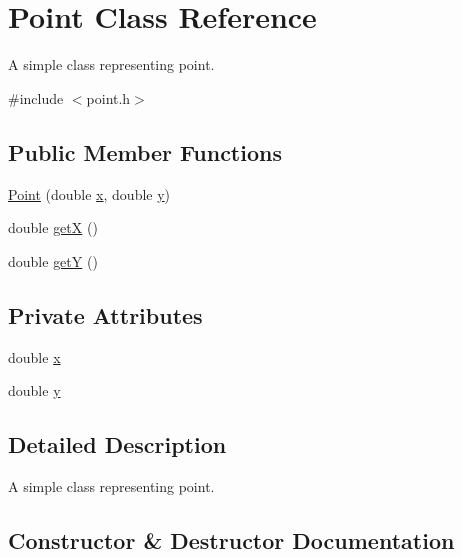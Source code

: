 \hypertarget{classMODEL_1_1Point}{}\section{Point Class Reference}
\label{classMODEL_1_1Point}


A simple class representing point.  




{\ttfamily \#include $<$point.\+h$>$}

\subsection*{Public Member Functions}
\begin{DoxyCompactItemize}
\item 
\hyperlink{classMODEL_1_1Point_a8eb76552ab4daf01a92da58843a0253b}{Point} (double \hyperlink{classMODEL_1_1Point_af88b946fb90d5f08b5fb740c70e98c10}{x}, double \hyperlink{classMODEL_1_1Point_ab927965981178aa1fba979a37168db2a}{y})
\item 
double \hyperlink{classMODEL_1_1Point_a2b69e4312b7814c6efce42f851893409}{getX} ()
\item 
double \hyperlink{classMODEL_1_1Point_a15f19cf52955c8c3406831b288681358}{getY} ()
\end{DoxyCompactItemize}
\subsection*{Private Attributes}
\begin{DoxyCompactItemize}
\item 
double \hyperlink{classMODEL_1_1Point_af88b946fb90d5f08b5fb740c70e98c10}{x}
\item 
double \hyperlink{classMODEL_1_1Point_ab927965981178aa1fba979a37168db2a}{y}
\end{DoxyCompactItemize}


\subsection{Detailed Description}
A simple class representing point. 

\subsection{Constructor \& Destructor Documentation}
